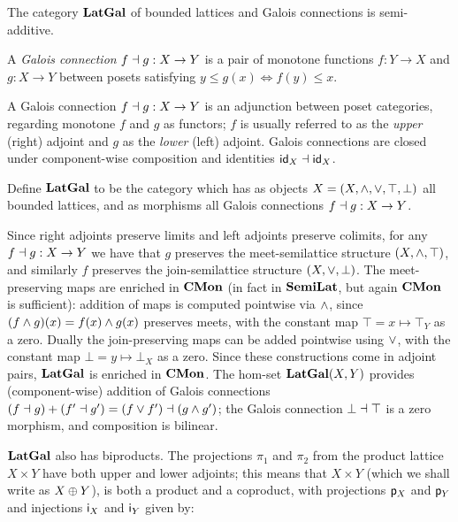 The category $\mathbf{LatGal}$ of bounded lattices and Galois connections is semi-additive.

\begin{definition}
A \emph{Galois connection} $f \dashv g: X \to Y$ is a pair of monotone functions $f: Y \to X$ and $g: X \to Y$
between posets satisfying $y \leq g(x) \iff f(y) \leq x$.
\end{definition}

\noindent A Galois connection $f \dashv g: X \to Y$ is an adjunction between poset categories, regarding
monotone $f$ and $g$ as functors; $f$ is usually referred to as the \emph{upper} (right) adjoint and $g$ as
the \emph{lower} (left) adjoint. Galois connections are closed under component-wise composition and identities
$\mathsf{id}_X \dashv \mathsf{id}_X$.

\begin{definition}
Define $\mathbf{LatGal}$ to be the category which has as objects $X = (X, \wedge, \vee, \top, \bot)$ all bounded
lattices, and as morphisms all Galois connections $f \dashv g: X \to Y$.
\end{definition}

\noindent Since right adjoints preserve limits and left adjoints preserve colimits, for any $f \dashv g: X \to
Y$ we have that $g$ preserves the meet-semilattice structure $(X, \wedge, \top)$, and similarly $f$ preserves
the join-semilattice structure $(X, \vee, \bot)$. The meet-preserving maps are enriched in $\mathbf{CMon}$ (in fact
in $\mathbf{SemiLat}$, but again $\mathbf{CMon}$ is sufficient): addition of maps is computed pointwise via $\wedge$, since $(f
\wedge g)(x) = f(x) \wedge g(x)$ preserves meets, with the constant map $\top = x \mapsto \top_Y$ as a zero.
Dually the join-preserving maps can be added pointwise using $\vee$, with the constant map $\bot = y \mapsto
\bot_X$ as a zero. Since these constructions come in adjoint pairs, $\mathbf{LatGal}$ is enriched in $\mathbf{CMon}$. The
hom-set $\mathbf{LatGal}(X,Y)$ provides (component-wise) addition of Galois connections $(f \dashv g) + (f' \dashv g') =
(f \vee f') \dashv (g \wedge g')$; the Galois connection $\bot \dashv \top$ is a zero morphism, and composition is
bilinear.

$\mathbf{LatGal}$ also has biproducts. The projections $\pi_1$ and $\pi_2$ from the product lattice $X \times Y$ have
both upper and lower adjoints; this means that $X \times Y$ (which we shall write as $X \oplus Y$), is both a
product and a coproduct, with projections $\mathsf{p}_X$ and $\mathsf{p}_Y$ and injections $\mathsf{i}_X$ and $\mathsf{i}_Y$
given by:

